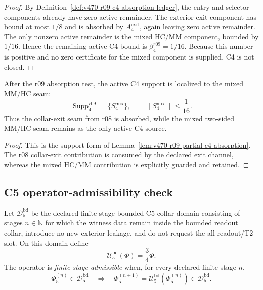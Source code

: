 \begin{proof}
By Definition~\ref{def:v470-r09-c4-absorption-ledger}, the entry and selector
components already have zero active remainder.  The exterior-exit component has
bound at most \(1/8\) and is absorbed by \(A_4^{\mathrm{exit}}\), again leaving
zero active remainder.  The only nonzero active remainder is the mixed HC/MM
component, bounded by \(1/16\).  Hence the remaining active C4 bound is
\(\beta_4^{r09}=1/16\).  Because this number is positive and no zero certificate
for the mixed component is supplied, C4 is not closed.
\end{proof}

\begin{proposition}
\label{prop:v470-r09-c4-residual-localization}
After the r09 absorption test, the active C4 support is localized to the mixed
MM/HC seam:
\[
\operatorname{Supp}_{4}^{r09}
=
\{S_{4}^{\mathrm{mix}}\},
\qquad
\|S_{4}^{\mathrm{mix}}\|\leq \frac1{16}.
\]
Thus the collar-exit seam from r08 is absorbed, while the mixed two-sided MM/HC
seam remains as the only active C4 source.
\end{proposition}

\begin{proof}
This is the support form of Lemma~\ref{lem:v470-r09-partial-c4-absorption}.  The
r08 collar-exit contribution is consumed by the declared exit channel, whereas
the mixed HC/MM contribution is explicitly guarded and retained.
\end{proof}

\subsection{C5 operator-admissibility check}
\label{subsec:v470-r09-c5-operator-admissibility-check}

\begin{definition}
\label{def:v470-r09-bounded-c5-operator-domain}
Let \(\mathcal D_5^{\mathrm{bd}}\) be the declared finite-stage bounded C5
collar domain consisting of stages \(n\in\mathbb N\) for which the witness data
remain inside the bounded readout collar, introduce no new exterior leakage,
and do not request the all-readout/T2 slot.  On this domain define
\[
\mathcal U_5^{\mathrm{bd}}(\Phi)=\frac34\Phi.
\]
The operator is \emph{finite-stage admissible} when, for every declared finite
stage \(n\),
\[
\Phi_5^{(n)}\in\mathcal D_5^{\mathrm{bd}}
\quad\Longrightarrow\quad
\Phi_5^{(n+1)}=\mathcal U_5^{\mathrm{bd}}(\Phi_5^{(n)})
\in\mathcal D_5^{\mathrm{bd}}.
\]
\end{definition}

